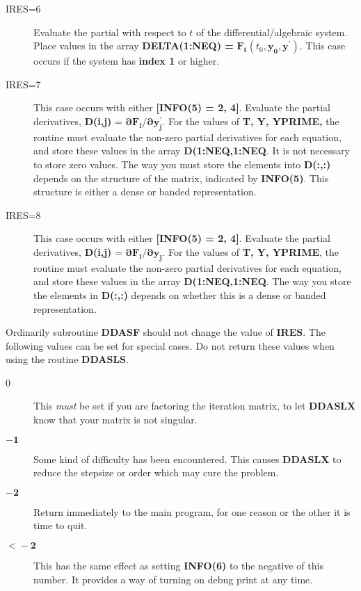 \documentclass[twoside]{MATH77}
\begin{document}
\begin{description}
\item[IRES=6] Evaluate the partial with respect to $t$ of the
  differential/algebraic system.  Place values in the array \textbf{DELTA(1:NEQ) =}
  $\mathbf{F_t}(t_0,\mathbf{y_0},\mathbf{y}^{\prime})$.  This case occurs if the system
  has \textbf{index 1} or higher.

\item[IRES=7] This case occurs with either \textbf{[INFO(5) = 2, 4]}.
  Evaluate the partial derivatives, \textbf{D(i,j)} = $\mathbf{\partial F_{i}/\partial y_{j}^{\prime}}$.
 For the values of  \textbf{T, Y, YPRIME,} the routine must evaluate the non-zero partial
  derivatives for each equation, and store these values in the array
  \textbf{D(1:NEQ,1:NEQ}.  It is not necessary to store zero values.  The
  way you must store the elements into \textbf{D(:,:)} depends on the structure of
  the matrix, indicated by \textbf{INFO(5)}.  This structure is either a dense or banded representation.

\item[IRES=8] This case occurs with either \textbf{[INFO(5) = 2, 4]}.
  Evaluate the partial derivatives, \textbf{D(i,j)} = $\mathbf{\partial F_{i}/\partial y_{j}}$.
 For the values of  \textbf{T, Y, YPRIME}, the routine must evaluate the non-zero partial
  derivatives for each equation, and store these values in the array
  \textbf{D(1:NEQ,1:NEQ}.  The way you store the elements in 
  \textbf{D(:,:)} depends on whether this is a dense or banded representation.

\end{description}

Ordinarily subroutine \textbf{DDASF} should not change the value of
\textbf{IRES}.  The following values can be set for special cases.
Do not return these values  when using the routine \textbf{DDASLS}.

\vspace{-8pt}
\begin{description}
\item[\phantom{$-$}0] This {\em must} be set if you are factoring the
  iteration matrix, to let \textbf{DDASLX} know that your matrix is not
  singular.
\item[$\mathbf{-1}$] Some kind of difficulty has been encountered. This
  causes \textbf{DDASLX} to reduce the stepsize or order which may cure the
  problem.
\item[$\mathbf{-2}$] Return immediately to the main program, for one reason
  or the other it is time to quit.
\item[$\mathbf{<\!-2}$] This has the same effect as setting \textbf{INFO(6)}
  to the negative of this number.  It provides a way of turning on debug
  print at any time.
\end{description}
\end{document}
